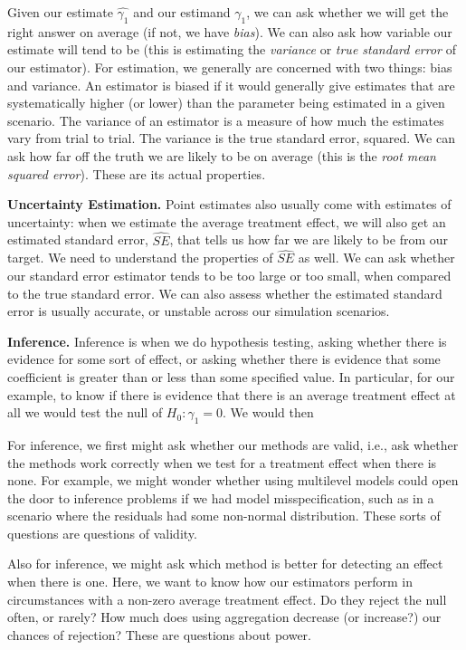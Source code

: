 \documentclass[
]{book}
\begin{document}
Given our estimate \(\hat{\gamma_1}\) and our estimand \(\gamma_1\), we can ask whether we will get the right answer on average (if not, we have \emph{bias}).
We can also ask how variable our estimate will tend to be (this is estimating the \emph{variance} or \emph{true standard error} of our estimator).
For estimation, we generally are concerned with two things: bias and variance.
An estimator is biased if it would generally give estimates that are systematically higher (or lower) than the parameter being estimated in a given scenario.
The variance of an estimator is a measure of how much the estimates vary from trial to trial.
The variance is the true standard error, squared.
We can ask how far off the truth we are likely to be on average (this is the \emph{root mean squared error}).
These are its actual properties.

\textbf{Uncertainty Estimation.}
Point estimates also usually come with estimates of uncertainty: when we estimate the average treatment effect, we will also get an estimated standard error, \(\widehat{SE}\), that tells us how far we are likely to be from our target.
We need to understand the properties of \(\widehat{SE}\) as well.
We can ask whether our standard error estimator tends to be too large or too small, when compared to the true standard error. We can also assess whether the estimated standard error is usually accurate, or unstable across our simulation scenarios.

\textbf{Inference.}
Inference is when we do hypothesis testing, asking whether there is evidence for some sort of effect, or asking whether there is evidence that some coefficient is greater than or less than some specified value.
In particular, for our example, to know if there is evidence that there is an average treatment effect at all we would test the null of \(H_0: \gamma_1 = 0\).
We would then

For inference, we first might ask whether our methods are valid, i.e., ask whether the methods work correctly when we test for a treatment effect when there is none.
For example, we might wonder whether using multilevel models could open the door to inference problems if we had model misspecification, such as in a scenario where the residuals had some non-normal distribution.
These sorts of questions are questions of validity.

Also for inference, we might ask which method is better for detecting an effect when there is one.
Here, we want to know how our estimators perform in circumstances with a non-zero average treatment effect.
Do they reject the null often, or rarely?
How much does using aggregation decrease (or increase?) our chances of rejection?
These are questions about power.
\end{document}
